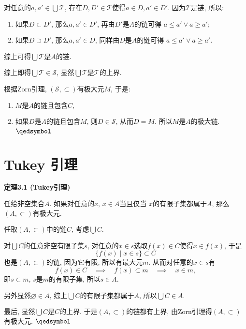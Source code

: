 \documentclass[UTF8]{ctexart}
\begin{document}
\vspace{3pt}
对任意的$\displaystyle a,a'\in\bigcup\mathcal{T}$,
存在$D,D'\in\mathcal{T}$使得$a\in D,a'\in D'$. 因为$\mathcal{T}$是链, 所以:
\vspace{3pt}
\begin{enumerate}
    \item 如果$D\subset D'$, 那么$a,a'\in D'$, 再由$D'$是$A$的链可得
    $a\leqslant a'\lor a\geqslant a'$;
    \item 如果$D\supset D'$, 那么$a,a'\in D$, 同样由$D$是$A$的链可得
    $a\leqslant a'\lor a\geqslant a'$.
\end{enumerate}
\vspace{3pt}
综上可得$\displaystyle\bigcup\mathcal{T}$是$A$的链.

\vspace{7pt}
综上即得$\displaystyle\bigcup\mathcal{T}\in\mathcal{S}$,
显然$\displaystyle\bigcup\mathcal{T}$是$\mathcal{T}$的上界.

\vspace{7pt}
根据Zorn引理, $(\mathcal{S},\subset)$有极大元$M$, 于是:
\begin{enumerate}
    \item $M$是$A$的链且包含$C$,
    \item 如果$D$是$A$的链且包含$M$, 则$D\in\mathcal{S}$, 从而$D=M$.
    所以$M$是$A$的极大链. \hfill $\qedsymbol$
\end{enumerate}





\vspace{20pt}

\section{Tukey 引理}

\hypertarget{sec:定理3.1}{}
\noindent\textbf{定理3.1 (Tukey引理)}

任给非空集合$A$. 如果对任意的$x$, $x\in A$当且仅当
$x$的有限子集都属于$A$, 那么$(A,\subset)$有极大元.


任取$(A,\subset)$中的链$C$, 考虑$\displaystyle\bigcup C$.

对$\displaystyle\bigcup C$的任意非空有限子集$s$,
对任意的$x\in s$选取$f(x)\in C$使得$x\in f(x)$, 于是
\[
    \{f(x)\mid x\in s\}\subset C
\]
也是$(A,\subset)$的链, 因为它有限, 所以有最大元$m$. 从而对任意的$x\in s$有
\[
    f(x)\in C\quad\implies\quad f(x)\subset m\quad\implies\quad x\in m,
\]
即$s\subset m$, $s$是$m$的有限子集, 所以$s\in A$.

另外显然$\varnothing\in A$, 综上$\displaystyle\bigcup C$的有限子集都属于$A$,
所以$\displaystyle\bigcup C\in A$.

最后, 显然$\displaystyle\bigcup C$是$C$的上界.
于是$(A,\subset)$的链都有上界, 由Zorn引理得$(A,\subset)$有极大元. \hfill $\qedsymbol$
\end{document}
